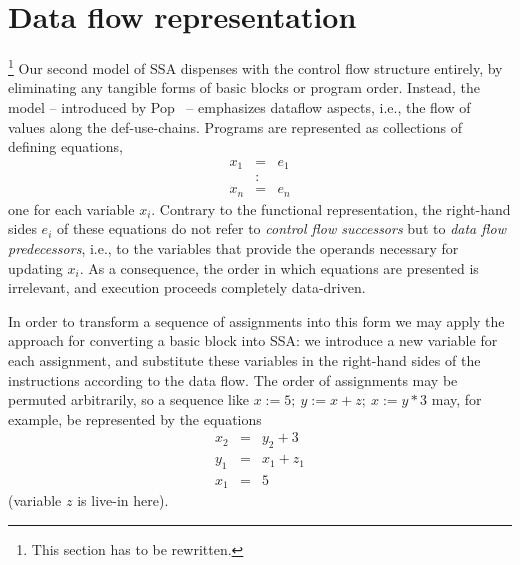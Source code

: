 {%

\section{Data flow representation}
\label{section:Part1:Semantics:PopSemantics}
\footnote{This section has to be rewritten.}
Our second model of SSA dispenses with the control flow structure
entirely, by eliminating any tangible forms of basic blocks or program
order. Instead, the model -- introduced by Pop~\cite{PopJS2007} --
emphasizes dataflow aspects, i.e., the flow of values along the
def-use-chains.
Programs are represented as collections
of defining equations,
\begin{eqnarray*}
x_1 & = & e_1\\
& : &\\
x_n & = & e_n
\end{eqnarray*}
one for each variable $x_i$. Contrary to the functional
representation, the right-hand sides $e_i$ of these equations do not
refer to \emph{control flow successors} but to \emph{data flow
predecessors}, i.e., to the variables that provide the operands
necessary for updating $x_i$. As a consequence, the order in which
equations are presented is irrelevant, and execution proceeds
completely data-driven.

In order to transform a sequence of assignments into this form we may
apply the approach for converting a basic block into SSA: we introduce
a new variable for each assignment, and substitute these variables in
the right-hand sides of the instructions according to the data
flow. The order of assignments may be permuted arbitrarily, so a
sequence like $x := 5;\ y:=x+z;\ x:=y*3$ may, for example, be
represented by the equations
\begin{eqnarray*}
x_2 & = & y_2 + 3\\
y_1 & = & x_1 + z_1\\
x_1 & = & 5
\end{eqnarray*}
(variable $z$ is live-in here).

}
